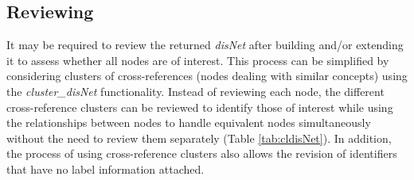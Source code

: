 \documentclass[9pt,a4paper,]{extarticle}
\begin{document}
\hypertarget{reviewing}{%
\subsection{Reviewing}\label{reviewing}}

It may be required to review the returned \emph{disNet} after building and/or extending it to assess whether all nodes are of interest. This process can be simplified by considering clusters of cross-references (nodes dealing with similar concepts) using the \emph{cluster\_disNet} functionality. Instead of reviewing each node, the different cross-reference clusters can be reviewed to identify those of interest while using the relationships between nodes to handle equivalent nodes simultaneously without the need to review them separately (Table \ref{tab:cldisNet}). In addition, the process of using cross-reference clusters also allows the revision of identifiers that have no label information attached.
\end{document}
